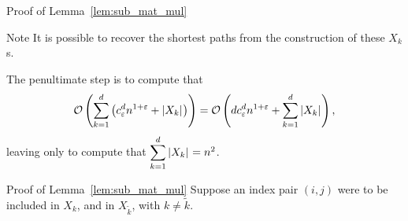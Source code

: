 \begin{frame}{Proof of Lemma~\ref{lem:sub_mat_mul}}
    \begin{exampleblock}{Note}
        It is possible to recover the shortest paths from the construction of these $X_k$s.
    \end{exampleblock}

    The penultimate step is to compute that
    \begin{align*}
        \mathcal{O}\left( \sum\limits_{k = 1}^d \left( c_\varepsilon^d n^{1 + \varepsilon} + \left\lvert X_k\right\rvert_{} \right) \right) = \mathcal{O}\left( d c_\varepsilon^d n^{1 + \varepsilon} + \sum\limits_{k = 1}^d \left\lvert X_k\right\rvert_{} \right),
    \end{align*}
    leaving only to compute that $\begin{aligned}\sum\limits_{k = 1}^d \left\lvert X_k\right\rvert_{}\end{aligned} = n^2$.
\end{frame}

\begin{frame}{Proof of Lemma~\ref{lem:sub_mat_mul}}
    Suppose an index pair $(i, j)$ were to be included in $X_k$, and in $X_{\tilde{k}}$, with $k \neq \tilde{k}$.




\end{frame}

